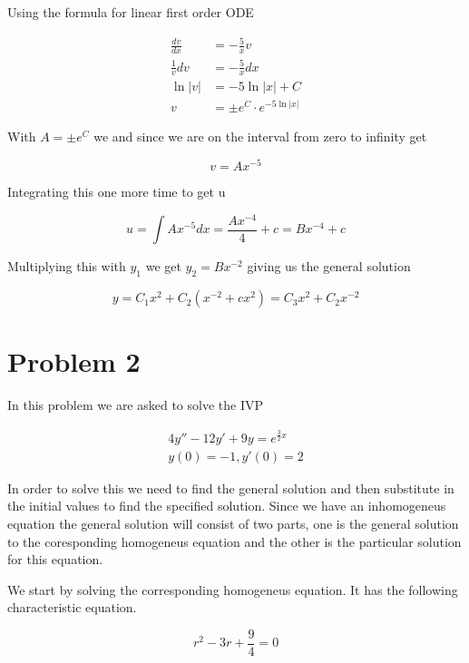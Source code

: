 \documentclass[a4paper]{article}
\begin{document}
Using the formula for linear first order ODE

\begin{align}
    \frac{dv}{dx} &= -\frac{5}{x} v\\
    \frac{1}{v} dv &= -\frac{5}{x} dx\\
    \ln{|v|} &= -5\ln{|x|} + C\\
    v &= \pm e^C \cdot e^{-5\ln{|x|}}
\end{align}

With $A=\pm e^C$ we  and since we are on the interval from zero to infinity get

\begin{equation}
    v=Ax^{-5}
\end{equation}

Integrating this one more time to get u

\begin{equation}
    u = \int Ax^{-5} dx = \frac{Ax^{-4}}{4} + c = Bx^{-4} + c
\end{equation}

Multiplying this with $y_1$ we get $y_2 = Bx^{-2}$ giving us the general solution 

\begin{equation}
    y = C_1x^2 + C_2(x^{-2} + cx^2) = C_3x^2 + C_2x^{-2}
\end{equation}

\pagebreak

\section*{Problem 2}

In this problem we are asked to solve the IVP 

\begin{align}
    4y'' - 12y' + 9y = e^{\frac{3}{2}x}\\
    y(0) = -1, y'(0) = 2
\end{align}

In order to solve this we need to find the general solution and then substitute in the initial values to find the specified solution. Since we have an inhomogeneus equation the general solution will consist of two parts, one is the general solution to the coresponding homogeneus equation and the other is the particular solution for this equation. 

We start by solving the corresponding homogeneus equation. It has the following characteristic equation.

\begin{equation}
    r^2 - 3r + \frac{9}{4} = 0
\end{equation}
\end{document}
